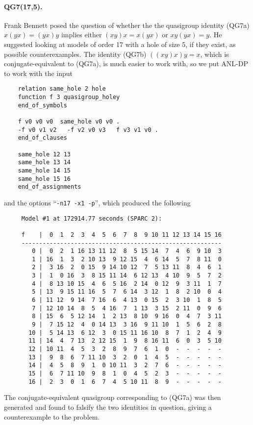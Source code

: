 \paragraph{QG7(17,5).}  Frank Bennett posed \cite{bennett-email} the question
of whether the the quasigroup identity (QG7a) $x(yx) = (yx)y$ implies
either $(xy)x = x(yx)$ or $xy(yx) = y$.  He suggested looking at
models of order 17 with a hole of size 5, if they exist, as possible
counterexamples.  The identity (QG7b) $((xy)x)y = x$, which is
conjugate-equivalent \cite{qg-survey} to (QG7a), is much easier to
work with, so we put ANL-DP to work with the input
{\small \begin{verbatim}
    relation same_hole 2 hole
    function f 3 quasigroup_holey
    end_of_symbols

    f v0 v0 v0  same_hole v0 v0 .
    -f v0 v1 v2   -f v2 v0 v3   f v3 v1 v0 .
    end_of_clauses

    same_hole 12 13
    same_hole 13 14
    same_hole 14 15
    same_hole 15 16
    end_of_assignments
\end{verbatim}} \noindent
and the options ``\verb:-n17 -x1 -p:'', which produced the following
{\small \begin{verbatim}
     Model #1 at 172914.77 seconds (SPARC 2):
    
     f    |  0  1  2  3  4  5  6  7  8  9 10 11 12 13 14 15 16
     ---------------------------------------------------------
        0 |  0  2  1 16 13 11 12  8  5 15 14  7  4  6  9 10  3
        1 | 16  1  3  2 10 13  9 12 15  4  6 14  5  7  8 11  0
        2 |  3 16  2  0 15  9 14 10 12  7  5 13 11  8  4  6  1
        3 |  1  0 16  3  8 15 11 14  6 12 13  4 10  9  5  7  2
        4 |  8 13 10 15  4  6  5 16  2 14  0 12  9  3 11  1  7
        5 | 13  9 15 11 16  5  7  6 14  3 12  1  8  2 10  0  4
        6 | 11 12  9 14  7 16  6  4 13  0 15  2  3 10  1  8  5
        7 | 12 10 14  8  5  4 16  7  1 13  3 15  2 11  0  9  6
        8 | 15  6  5 12 14  1  2 13  8 10  9 16  0  4  7  3 11
        9 |  7 15 12  4  0 14 13  3 16  9 11 10  1  5  6  2  8
       10 |  5 14 13  6 12  3  0 15 11 16 10  8  7  1  2  4  9
       11 | 14  4  7 13  2 12 15  1  9  8 16 11  6  0  3  5 10
       12 | 10 11  4  5  3  2  8  9  7  6  1  0  -  -  -  -  -
       13 |  9  8  6  7 11 10  3  2  0  1  4  5  -  -  -  -  -
       14 |  4  5  8  9  1  0 10 11  3  2  7  6  -  -  -  -  -
       15 |  6  7 11 10  9  8  1  0  4  5  2  3  -  -  -  -  -
       16 |  2  3  0  1  6  7  4  5 10 11  8  9  -  -  -  -  -
\end{verbatim}} \noindent
The conjugate-equivalent quasigroup corresponding to (QG7a) was then
generated and found to falsify the two identities in question,
giving a counterexample to the problem.

